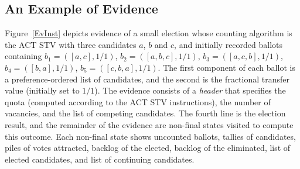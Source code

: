 \documentclass[10pt,conference]{IEEEtran}
\begin{document}
 \subsection{An Example of Evidence}
\label{subsec:InstEv}
Figure~\ref{EvInst} depicts evidence of a small election whose counting algorithm is the ACT STV 
with three candidates $a$, $b$ and $c$, and initially recorded ballots containing
$b_1=([a,c],1/1)$, $b_2=([a,b,c],1/1)$, $b_3=([a,c,b],1/1)$,
$b_4=([b,a],1/1)$, $b_5=([c,b,a],1/1)$.  The first component of each ballot is a preference-ordered list of candidates, and the second is the fractional transfer value (initially set to $1/1$). The evidence consists of a \emph{header} that specifies the quota (computed according to the ACT STV instructions), the number of vacancies, and the list of competing candidates. 
The fourth line is the election result, and the remainder of the evidence are non-final states visited to compute this
outcome. Each non-final state shows uncounted ballots, tallies of candidates, piles of votes attracted, backlog of the elected, backlog of the eliminated, list of elected candidates, and list of continuing candidates. 
\end{document}
